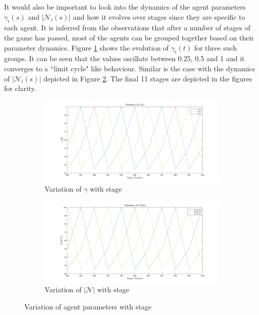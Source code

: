 \documentclass[11pt, letterpaper]{article}
\begin{document}
It would also be important to look into the dynamics of the agent parameters $\gamma_i(s)$ and $|\mathcal{N}_i(s)|$ and how it evolves over stages since they are specific to each agent. It is inferred from the observations that after a number of stages of the game has passed, most of the agents can be grouped together based on their parameter dynamics. Figure \ref{fig:results_distributed_player_gamma} shows the evolution of $\gamma_i(t)$ for three such groups. It can be seen that the values oscillate between 0.25, 0.5 and 1 and it converges to a ``limit cycle" like behaviour. Similar is the case with the dynamics of $|\mathcal{N}_i(s)|$  depicted in Figure \ref{fig:results_distributed_player_neighbours}. The final 11 stages are depicted in the figures for clarity.

\begin{figure}[htbp]
    \centering
    \begin{subfigure}[c]{0.49\linewidth}
    \centering
    \includegraphics[width=\linewidth, trim=150 0 150 0, clip]{images/results_distributed_player_gamma.jpg}
    \caption{Variation of $\gamma$ with stage}
    \label{fig:results_distributed_player_gamma}
\end{subfigure}
\hfill
\begin{subfigure}[c]{0.49\linewidth}
    \centering
    \includegraphics[width=\linewidth, trim=150 0 150 0, clip]{images/results_distributed_player_neighbours.jpg}
    \caption{Variation of $|\mathcal{N}|$ with stage}
    \label{fig:results_distributed_player_neighbours}
\end{subfigure}
    \caption{Variation of agent parameters with stage}
    \label{fig:results_distributed_player}
\end{figure}
\end{document}
